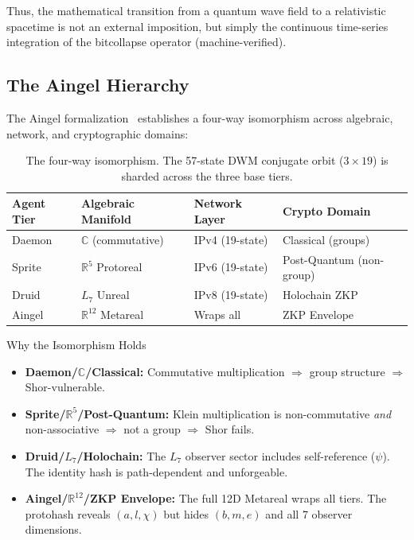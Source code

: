 Thus, the mathematical transition from a quantum wave field to a relativistic spacetime is not an external imposition, but simply the continuous time-series integration of the bitcollapse operator (machine-verified).



\subsection{The Aingel Hierarchy}

The Aingel formalization~\cite{Aingel} establishes a four-way isomorphism across algebraic, network, and cryptographic domains:

\begin{table}[H]
\centering
\begin{tabular}{@{}llll@{}}
\toprule
\textbf{Agent Tier} & \textbf{Algebraic Manifold} & \textbf{Network Layer} & \textbf{Crypto Domain} \\
\midrule
Daemon & $\mathbb{C}$ (commutative) & IPv4 (19-state) & Classical (groups) \\
Sprite & $\mathbb{R}^5$ Protoreal & IPv6 (19-state) & Post-Quantum (non-group) \\
Druid & $L_7$ Unreal & IPv8 (19-state) & Holochain ZKP \\
Aingel & $\mathbb{R}^{12}$ Metareal & Wraps all & ZKP Envelope \\
\bottomrule
\end{tabular}
\caption{The four-way isomorphism. The 57-state DWM conjugate orbit ($3 \times 19$) is sharded across the three base tiers.}
\end{table}

\begin{aingelbox}{Why the Isomorphism Holds}
\begin{itemize}
    \item \textbf{Daemon/$\mathbb{C}$/Classical:} Commutative multiplication $\Rightarrow$ group structure $\Rightarrow$ Shor-vulnerable.
    \item \textbf{Sprite/$\mathbb{R}^5$/Post-Quantum:} Klein multiplication is non-commutative \emph{and} non-associative $\Rightarrow$ not a group $\Rightarrow$ Shor fails.
    \item \textbf{Druid/$L_7$/Holochain:} The $L_7$ observer sector includes self-reference ($\psi$). The identity hash is path-dependent and unforgeable.
    \item \textbf{Aingel/$\mathbb{R}^{12}$/ZKP Envelope:} The full 12D Metareal wraps all tiers. The protohash reveals $(a, l, \chi)$ but hides $(b, m, e)$ and all 7 observer dimensions.
\end{itemize}
\end{aingelbox}

